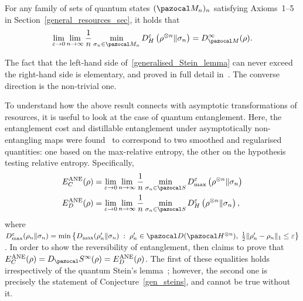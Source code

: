 \documentclass[11pt,notitlepage,tightenlines,nofootinbib,superscriptaddress]{revtex4-1}
\begin{document}
\begin{cj}\label{gen_steins}
For any family of sets of quantum states $(\MM_n)_n$ satisfying Axioms~1--5 in Section~\ref{general_resources_sec}, it holds that
\begin{equation}\begin{aligned}
    \lim_{\epsilon \to 0} \lim_{n \to \infty} \frac1n \min_{\sigma_n \in \MM_n} D^\epsilon_H \left(\rho^{\otimes n} \| \sigma_n \right) = D^\infty_{\MM}(\rho).
    \label{generalised_Stein_lemma}
\end{aligned}\end{equation}
\end{cj}

The fact that the left-hand side of~\eqref{generalised_Stein_lemma} can never exceed the right-hand side is elementary, and proved in full detail in~\cite{Brandao2010}. The converse direction is the non-trivial one.

To understand how the above result connects with asymptotic transformations of resources, it is useful to look at the case of quantum entanglement. Here, the entanglement cost and distillable entanglement under asymptotically non-entangling maps were found~\cite{BrandaoPlenio2} to correspond to two smoothed and regularised quantities: one based on the max-relative entropy, the other on the hypothesis testing relative entropy. Specifically,
\begin{equation}\begin{aligned}\label{eq:ANE_EC_ED}
    E_C^{\mathrm{ANE}}(\rho) &= \lim_{\epsilon \to 0} \lim_{n \to \infty} \frac1n \min_{\sigma_n \in \SEP} D^\epsilon_{\max} \left(\rho^{\otimes n} \| \sigma_n\right)\\
    E_D^{\mathrm{ANE}}(\rho) &= \lim_{\epsilon \to 0} \lim_{n \to \infty} \frac1n \min_{\sigma_n \in \SEP} D^\epsilon_{H} \left(\rho^{\otimes n} \| \sigma_n\right),
\end{aligned}\end{equation}
where $D^\epsilon_{\max} (\rho_n \| \sigma_n) = \min \left\{ D_{\max}(\rho'_n\|\sigma_n) \;:\; \rho'_n \in \D(\HH^{\otimes n}),\; \frac12 \|\rho'_n-\rho_n\|_1 \leq \epsilon \right\}$. In order to show the reversibility of entanglement, \cite{BrandaoPlenio2} then claims to prove that $E_C^{\mathrm{ANE}}(\rho) = D_\SEP^\infty(\rho) = E_D^{\mathrm{ANE}}(\rho) $. The first of these equalities holds irrespectively of the quantum Stein's lemma~\cite{BrandaoPlenio2,datta_2009-2}; however, the second one is precisely the statement of Conjecture~\ref{gen_steins}, and cannot be true without it.
\end{document}
